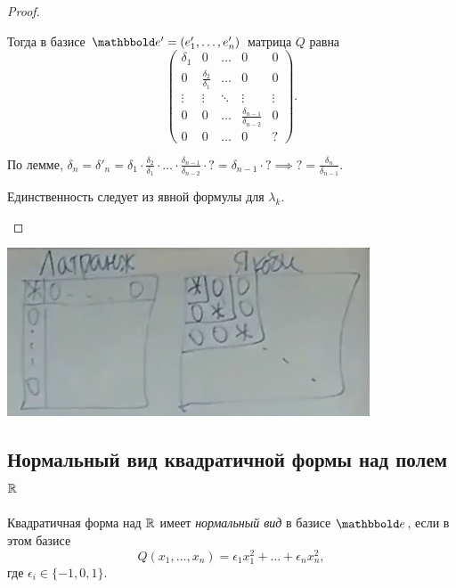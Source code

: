 \begin{proof}
\begin{description}
        Тогда в базисе $\E' = (e'_1, \dots, e'_n)$ матрица $Q$ равна
        \begin{equation*}
            \begin{pmatrix} 
                \delta_1 & 0 & \dots & 0 & 0 \\
                0 & \frac{\delta_2}{\delta_1} & \dots & 0 & 0 \\
                \vdots & \vdots & \ddots & \vdots & \vdots \\
                0 & 0 & \dots & \frac{\delta_{n - 1}}{\delta_{n - 2}} & 0 \\
                0 & 0 & \dots & 0 & ?
            \end{pmatrix}
        .\end{equation*}

        По лемме, $\delta_n = \delta'_n = \delta_1 \cdot \frac{\delta_2}{\delta_1} \cdot \dots \cdot \frac{\delta_{n - 1}}{\delta_{n - 2}} \cdot ? = \delta_{n - 1} \cdot ? \implies ? = \frac{\delta_n}{\delta_{n - 1}}$.

        Единственность следует из явной формулы для $\lambda_k$.
        \qedhere
    \end{description}
\end{proof}

\begin{center}
    \includegraphics[height=5cm]{lecture20_matrix}
\end{center}


\subsection{Нормальный вид квадратичной формы над полем $\mathbb{R}$}

\begin{definition}
    Квадратичная форма над $\mathbb{R}$ имеет \textit{нормальный вид} в базисе $\E$, если в этом базисе
    \begin{equation*}
        Q(x_1, \dots, x_n) = \epsilon_1 x_1^2 + \dots + \epsilon_n x_n^2
    ,\end{equation*}
    где $\epsilon_i \in \{-1, 0, 1\}$.
\end{definition}


